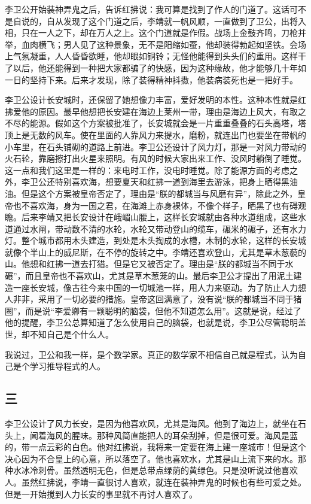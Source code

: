 李卫公开始装神弄鬼之后，告诉红拂说：我可算是找到了作人的门道了。这话可不是自说的，自从发现了这个门道之后，李靖就一帆风顺，一直做到了卫公，出将入相，只在一人之下，却在万人之上。这个门道就是作假。战场上金鼓齐鸣，刀枪并举，血肉横飞；男人见了这种景象，无不是阳缩如蚕，他却装得勃起如坚铁。会场上气氛凝重，人人昏昏欲睡，他却眼如铜铃；无怪他能得到头头们的重用。这样干了以后，他还能得到一种把大家都骗了的快感，因为这种缘故，他才能够几十年如一日的坚持下来。后来才发现，除了装得精神抖擞，他装病装死也是一把好手。 

李卫公设计长安城时，还保留了她想像力丰富，爱好发明的本性。这种本性就是红拂爱他的原因。最早他想把长安建在海边上莱州一带，理由是海边上风大，有取之不尽的能源。假如这个方案被批准了，长安城就会是一片重重叠叠的石头高塔，塔顶上是无数的风车。使在里面的人靠风力来提水，磨粉，就连出门也要坐在带帆的小车里，在石头铺砌的道路上前进。李卫公还设计了风力灯，那是一对风力带动的火石轮，靠磨擦打出火星来照明。有风的时候大家出来工作、没风时躺倒了睡觉。这一点和我们这里是一样的：来电时工作，没电时睡觉。除了能源方面的考虑之外，李卫公还特别喜欢海，想要夏天和红拂一道到海里去游泳，把身上晒得黑油油。但是这个方案被皇帝否定了，理由是“朕的都城当与风磨有异”，除此之外，皇帝也不喜欢海，身为一国之君，在海滩上赤身裸体，不像个样子，晒黑了也有碍观瞻。后来李靖又把长安设计在峨嵋山腰上，这样长安城就由各种水道组成，这些水道通过水闸，带动数不清的水轮，水轮又带动登山的缆车，碾米的碾子，还有水力灯。整个城市都用木头建造，到处是木头掏成的水槽，木制的水轮，这样的长安城就像个半山上的威尼斯，在不停的旋转之中。李靖还喜欢登山，尤其是草木葱藐的山。他想和红拂一道去打猎。但是它又被否定了。理由是“朕的都城当不同于水碾”，而且皇帝也不喜欢山，尤其是草木葱笼的山。最后李卫公才提出了用泥土建造一座长安城，像古往今来中国的一切城池一样，用人力来驱动。为了防止人力想人非非，采用了一切必要的措施。皇帝这回满意了，没有说“朕的都城当不同于猪圈”，而是说“李爱卿有一颗聪明的脑袋，但他不知道怎么用”。这就是说，经过了他的提醒，李卫公总算知道了怎么使用自己的脑袋，也就是说，李卫公尽管聪明盖世，却不知自己是个什么人。 

我说过，卫公和我一样，是个数学家。真正的数学家不相信自己就是程式，认为自己是个学习推导程式的人。 

\subsection{三} 

李卫公设计了风力长安，是因为他喜欢风，尤其是海风。他到了海边上，就坐在石头上，闻着海风的腥味。那种风简直能把人的耳朵刮掉，但是很可爱。海风是蓝的，带一点云彩的白色。他对红拂说，我将来一定要在海上建一座城市！但是这个决心因为不合皇上的心意，所以落空了。他也喜欢水，尤其是山上流下来的水。那种水冰冷刺骨。虽然透明无色，但是总带点绿荫的黄绿色。只是没听说过他喜欢人。虽然红拂说，李靖一直很讨人喜欢，就连在装神弄鬼的时候也有些可爱之处。但是一开始搅到人力长安的事里就不再讨人喜欢了。 


